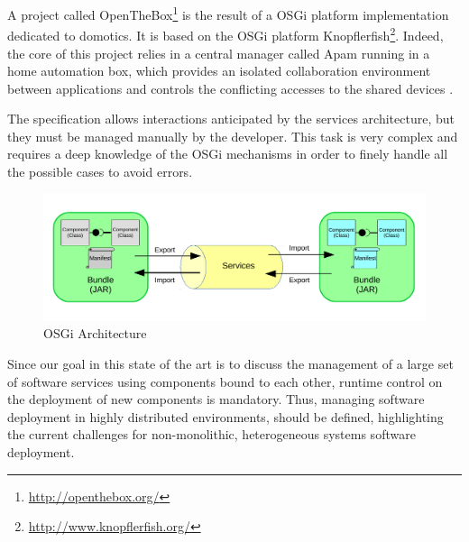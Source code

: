 A project called OpenTheBox\footnote{\url{http://openthebox.org/}} is the result of a OSGi platform implementation dedicated to domotics.
It is based on the OSGi platform Knopflerfish\footnote{\url{http://www.knopflerfish.org/}}.
Indeed, the core of this project relies in a central manager called Apam \cite{damou2013apam} running in a home automation box, which provides an isolated collaboration environment between applications \cite{estublier2012managing} and controls the conflicting accesses to the shared devices \cite{estublier2013resource}.
	
The specification allows interactions anticipated by the services architecture, but they must be managed manually by the developer.
This task is very complex and requires a deep knowledge of the OSGi mechanisms in order to finely handle all the possible cases to avoid errors.

\begin{figure}[htb]
	\centering
	\includegraphics[width=1\columnwidth]{chapters/stateOfTheArt.images/OSGI.pdf}
	\caption{OSGi Architecture}
	\label{fig:OSGI}
\end{figure}

Since our goal in this state of the art is to discuss the management of a large set of software services using components bound to each other, runtime control on the deployment of new components is mandatory.
Thus, managing software deployment in highly distributed environments, should be defined, highlighting the current challenges for non-monolithic, heterogeneous systems software deployment.

